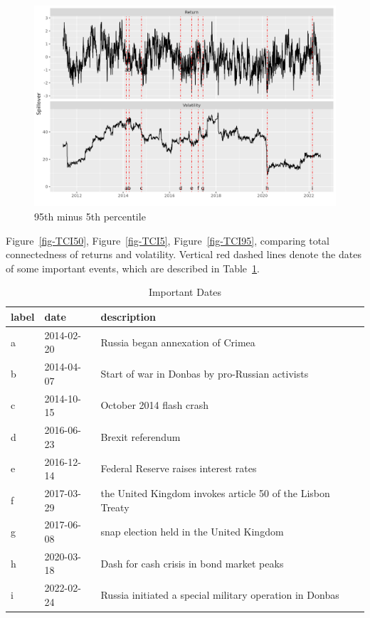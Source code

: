 \documentclass[
  letterpaper,
  DIV=11,
  numbers=noendperiod]{scrartcl}
\begin{document}
\begin{figure}[H]

{\centering \includegraphics{plots/fig-TCIrtd.png}

}

\caption{\label{fig-TCIrtd}95th minus 5th percentile}

\end{figure}

Figure~\ref{fig-TCI50}, Figure~\ref{fig-TCI5}, Figure~\ref{fig-TCI95},
comparing total connectedness of returns and volatility. Vertical red
dashed lines denote the dates of some important events, which are
described in Table~\ref{tbl-dates}.

\hypertarget{tbl-dates}{}
\begin{table}[H]
\caption{\label{tbl-dates}Important Dates }\tabularnewline

\centering
\begin{tabular}[t]{lll}
\toprule
label & date & description\\
\midrule
a & 2014-02-20 & Russia began annexation of Crimea\\
b & 2014-04-07 & Start of war in Donbas by pro-Russian activists\\
c & 2014-10-15 & October 2014 flash crash\\
d & 2016-06-23 & Brexit referendum\\
e & 2016-12-14 & Federal Reserve raises interest rates\\
\addlinespace
f & 2017-03-29 & the United Kingdom invokes article 50 of the Lisbon Treaty\\
g & 2017-06-08 & snap election held in the United Kingdom\\
h & 2020-03-18 & Dash for cash crisis in bond market peaks\\
i & 2022-02-24 & Russia initiated a special military operation in Donbas\\
\bottomrule
\end{tabular}
\end{table}
\end{document}
